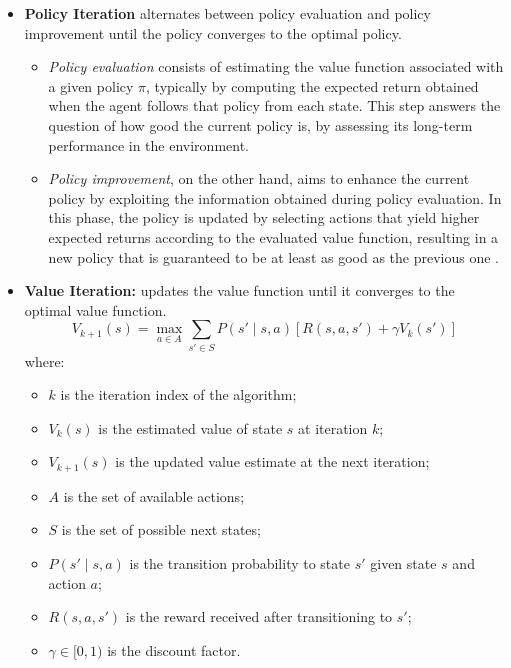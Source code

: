 \documentclass[12pt,a4paper]{report}
\begin{document}
\begin{itemize}
    \item \textbf{Policy Iteration} alternates between policy evaluation and policy 
    improvement until the policy converges to the optimal policy.
    \begin{itemize}
        \item \textit{Policy evaluation} consists of estimating the value function 
        associated with a given policy $\pi$, typically by computing the expected 
        return obtained when the agent follows that policy from each state. This step 
        answers the question of how good the current policy is, by assessing its 
        long-term performance in the environment.
        \item \textit{Policy improvement}, on the other hand, aims to enhance the 
        current policy by exploiting the information obtained during policy evaluation. 
        In this phase, the policy is updated by selecting actions that yield higher 
        expected returns according to the evaluated value function, resulting in a new 
        policy that is guaranteed to be at least as good as the previous one 
        \cite{chiave44}.
    \end{itemize}
    \item \textbf{Value Iteration:} updates the value function until it converges to 
    the optimal value function.
        \[
        V_{k+1}(s) = \max_{a \in A} \sum_{s' \in S} P(s' \mid s, a) 
    \left[ R(s, a, s') + \gamma V_k(s') \right]
        \]
    \noindent where:
        \begin{itemize}
            \item $k$ is the iteration index of the algorithm;
            \item $V_k(s)$ is the estimated value of state $s$ at iteration $k$;
            \item $V_{k+1}(s)$ is the updated value estimate at the next iteration;
            \item $A$ is the set of available actions;
            \item $S$ is the set of possible next states;
            \item $P(s' \mid s, a)$ is the transition probability to state $s'$ given state $s$ and action $a$;
            \item $R(s, a, s')$ is the reward received after transitioning to $s'$;
            \item $\gamma \in [0,1)$ is the discount factor.
        \end{itemize}
\end{itemize}
\end{document}
